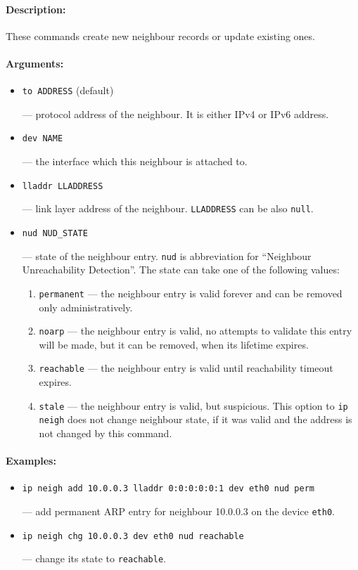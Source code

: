 \paragraph{Description:} These commands create new neighbour records
or update existing ones.

\paragraph{Arguments:}

\begin{itemize}
\item \verb|to ADDRESS| (default)

--- protocol address of the neighbour. It is either IPv4 or IPv6 address.

\item \verb|dev NAME|

--- the interface which this neighbour is attached to.


\item \verb|lladdr LLADDRESS|

--- link layer address of the neighbour. \verb|LLADDRESS| can be also
\verb|null|. 

\item \verb|nud NUD_STATE|

--- state of the neighbour entry. \verb|nud| is abbreviation for ``Neighbour
Unreachability Detection''. The state can take one of the following values:

\begin{enumerate}
\item \verb|permanent| --- the neighbour entry is valid forever and can be removed
only administratively.
\item \verb|noarp| --- the neighbour entry is valid, no attempts to validate
this entry will be made, but it can be removed, when its lifetime expires.
\item \verb|reachable| --- the neighbour entry is valid until reachability
timeout expires.
\item \verb|stale| --- the neighbour entry is valid, but suspicious.
This option to \verb|ip neigh| does not change neighbour state, if
it was valid and the address is not changed by this command.
\end{enumerate}

\end{itemize}

\paragraph{Examples:}
\begin{itemize}
\item \verb|ip neigh add 10.0.0.3 lladdr 0:0:0:0:0:1 dev eth0 nud perm|

--- add permanent ARP entry for neighbour 10.0.0.3 on the device \verb|eth0|.

\item \verb|ip neigh chg 10.0.0.3 dev eth0 nud reachable|

--- change its state to \verb|reachable|.
\end{itemize}



